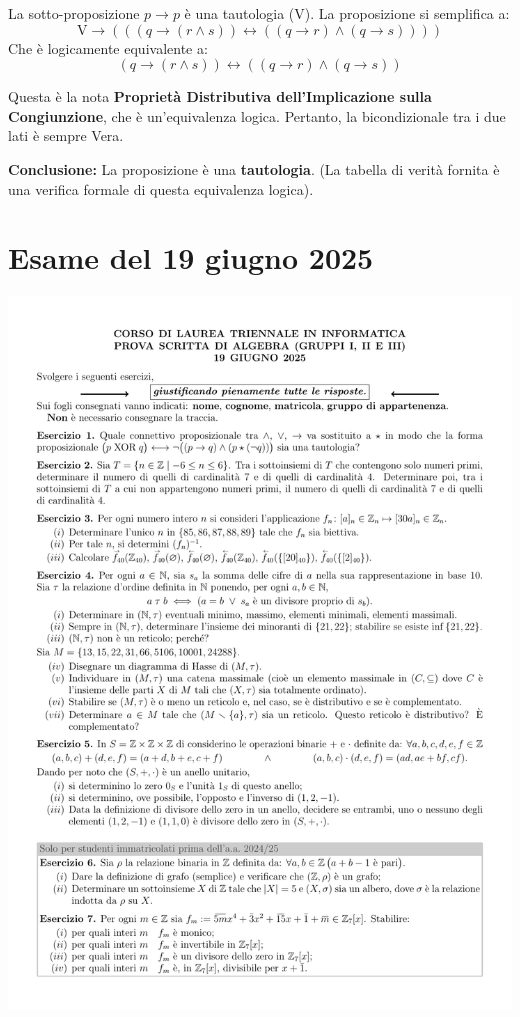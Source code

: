 La sotto-proposizione $p \to p$ è una tautologia ($\text{V}$). La proposizione si semplifica a:
$$ \text{V} \to (((q \to (r \wedge s)) \leftrightarrow ((q \to r) \wedge (q \to s)))) $$
Che è logicamente equivalente a:
$$ (q \to (r \wedge s)) \leftrightarrow ((q \to r) \wedge (q \to s)) $$

Questa è la nota \textbf{Proprietà Distributiva dell'Implicazione sulla Congiunzione}, che è un'equivalenza logica. Pertanto, la bicondizionale tra i due lati è sempre Vera.

\textbf{Conclusione:} La proposizione è una \textbf{tautologia}.
(La tabella di verità fornita è una verifica formale di questa equivalenza logica).


\section{Esame del 19 giugno 2025}
\begin{center}
    \includegraphics[scale=.85]{pdf/25-06-19.pdf}
\end{center}

